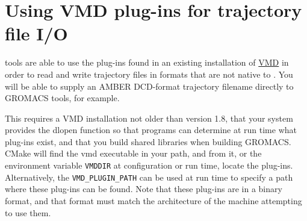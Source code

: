 \section{Using VMD plug-ins for trajectory file I/O}
 tools are able
to use the plug-ins found in an existing installation of
\href{http://www.ks.uiuc.edu/Research/vmd}{VMD} in order to read and
write trajectory files in formats that are not native to
{\gromacs}. You will be able to supply an AMBER DCD-format trajectory
filename directly to GROMACS tools, for example.

This requires a VMD installation not older than version 1.8, that your
system provides the dlopen function so that programs can determine at
run time what plug-ins exist, and that you build shared libraries when
building GROMACS. CMake will find the vmd executable in your path, and
from it, or the environment variable {\tt VMDDIR} at configuration or
run time, locate the plug-ins. Alternatively, the {\tt VMD_PLUGIN_PATH}
can be used at run time to specify a path where these plug-ins can be
found. Note that these plug-ins are in a binary format, and that format
must match the architecture of the machine attempting to use them.

